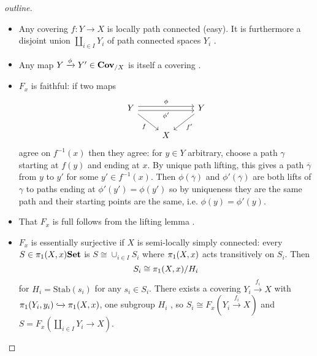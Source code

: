 \begin{proof}[outline]
    \begin{itemize}
        \item Any covering $f: Y \to X$ is locally path connected (easy). It is furthermore a disjoint union $\coprod_{i \in I} Y_i$ of path connected spaces $Y_i$ \cite[Theorem~25.4]{MunkresTopology}.
        \item Any map $Y \xrightarrow{\phi}Y' \in \catCoveringSpace_{/X}$ is itself a covering \cite[Lemma~80.2(a)]{MunkresTopology}.
        \item $F_x$ is faithful: if two maps 
        \[
            \begin{tikzcd}
                Y \arrow[rr, "\phi'"', shift right] \arrow[rr, "\phi", shift left] \arrow[rd, "f"'] &   & Y \arrow[ld, "f'"] \\
                & X & 
            \end{tikzcd}
        \] agree on $f^{-1}(x)$ then they agree: for $y \in Y$ arbitrary, choose a path $\gamma$ starting at $f(y)$ and ending at $x$. By unique path lifting, this gives a path $\overline{\gamma}$ from $y$ to $y'$ for some $y' \in f^{-1}(x)$. Then $\phi(\overline{\gamma})$ and $\phi'(\overline{\gamma})$ are both lifts of $\gamma$ to paths ending at $\phi'(y') = \phi(y')$ so by uniqueness they are the same path and their starting points are the same, i.e. $\phi(y) = \phi'(y)$. 
        \item That $F_x$ is full follows from the lifting lemma \cite[Lemma~79.1]{MunkresTopology}.
        \item $F_x$ is essentially surjective if $X$ is semi-locally simply connected: every $S \in \homotopy[1](X,x)\catSet$ is $S \cong \cup_{i\in I}S_i$ where $\homotopy[1](X,x)$ acts transitively on $S_i$.  Then \[
            S_i \cong \homotopy[1](X,x) / H_i
        \] for $H_i = \text{Stab}(s_i)$ for any $s_i \in S_i$. There exists a covering $Y_i \xrightarrow{f_i} X$ with $\homotopy[1](Y_i, y_i) \xhookrightarrow{} \homotopy[1](X,x)$, one subgroup $H_i$ \cite[Theorem~82.1]{MunkresTopology}, so $S_i \cong F_x(Y_i \xrightarrow{f_i} X)$ and $S = F_x(\coprod_{i \in I} Y_i \to X)$.
        \end{itemize}
\end{proof}
